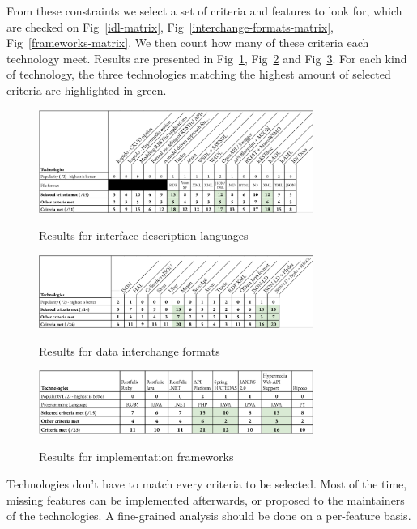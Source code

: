 From these constraints we select a set of criteria and features to look for, which are checked on Fig~\ref{idl-matrix}, Fig~\ref{interchange-formats-matrix}, Fig~\ref{frameworks-matrix}. We then count how many of these criteria each technology meet. Results are presented in Fig~\ref{example-idl-results}, Fig~\ref{example-dif-results} and Fig~\ref{example-frameworks-results}. For each kind of technology, the three technologies matching the highest amount of selected criteria are highlighted in green.

\begin{figure}[ht]
\caption{Results for interface description languages}
\centering
\includegraphics[width=0.8\textwidth]{figures/example-idl-results.png}
\label{example-idl-results}
\end{figure}

\begin{figure}[ht]
\caption{Results for data interchange formats}
\centering
\includegraphics[width=0.8\textwidth]{figures/example-dif-results.png}
\label{example-dif-results}
\end{figure}

\begin{figure}[ht]
\caption{Results for implementation frameworks}
\centering
\includegraphics[width=0.8\textwidth]{figures/example-frameworks-results.png}
\label{example-frameworks-results}
\end{figure}

Technologies don't have to match every criteria to be selected. Most of the time, missing features can be implemented afterwards, or proposed to the maintainers of the technologies. A fine-grained analysis should be done on a per-feature basis.

